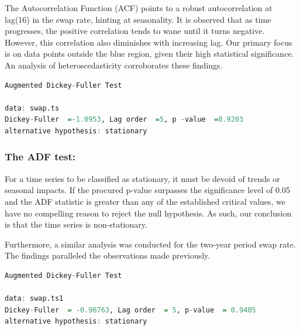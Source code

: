 \documentclass[10pt]{article}
\begin{document}
The Autocorrelation Function (ACF) points to a robust autocorrelation at lag(16) in the swap rate, hinting at seasonality. It is observed that as time progresses, the positive correlation tends to wane until it turns negative. However, this correlation also diminishes with increasing lag. Our primary focus is on data points outside the blue region, given their high statistical significance. An analysis of heteroscedasticity corroborates these findings.

\begin{lstlisting}[language = R]
        Augmented Dickey-Fuller Test
    
data: swap.ts
Dickey-Fuller  =-1.0953, Lag order  =5, p -value  =0.9203  
alternative hypothesis: stationary    

\end{lstlisting}

\subsubsection{The ADF test:}

For a time series to be classified as stationary, it must be devoid of trends or seasonal impacts. If the procured p-value surpasses the significance level of 0.05 and the ADF statistic is greater than any of the established critical values, we have no compelling reason to reject the null hypothesis. As such, our conclusion is that the time series is non-stationary.

Furthermore, a similar analysis was conducted for the two-year period swap rate. The findings paralleled the observations made previously.

\begin{lstlisting}[language = R]
        Augmented Dickey-Fuller Test
        
data: swap.ts1
Dickey-Fuller  = -0.96763, Lag order  = 5, p-value  = 0.9405 
alternative hypothesis: stationary  

\end{lstlisting}
\end{document}
